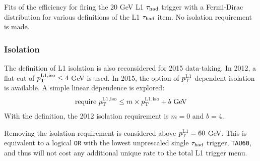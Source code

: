 \begin{table}[!htpb]
  \centering
  \renewcommand{\arraystretch}{1.4}
  \caption{Fits of the efficiency for firing the 20 GeV L1 $\tau_\text{had}$ trigger with a Fermi-Dirac distribution for various definitions of the L1 $\tau_\text{had}$ item. No isolation requirement is made.}
  
  \label{tab:prospects-tausize}
\end{table}

\clearpage

\subsubsection{Isolation}

The definition of L1 isolation is also reconsidered for 2015 data-taking. In 2012, a flat cut of $p_{\mathrm{T}}^\text{L1,iso} \leq 4$ GeV is used. In 2015, the option of $p_{\mathrm{T}}^\text{L1}$-dependent isolation is available. A simple linear dependence is explored:
%
\begin{equation}
  \begin{split}
    \text{require} \ \pt^\text{L1,iso} &\leq m \times \pt^\text{L1,iso} + b \ \text{GeV} \\
   \end{split}
  \label{eqn:prospects-L1iso}
\end{equation}
%
With the definition, the 2012 isolation requirement is $m=0$ and $b=4$.

Removing the isolation requirement is considered above $p_{\mathrm{T}}^\text{L1} = 60$ GeV. This is equivalent to a logical \texttt{OR} with the lowest unprescaled single $\tau_\text{had}$ trigger, \texttt{TAU60}, and thus will not cost any additional unique rate to the total L1 trigger menu.

